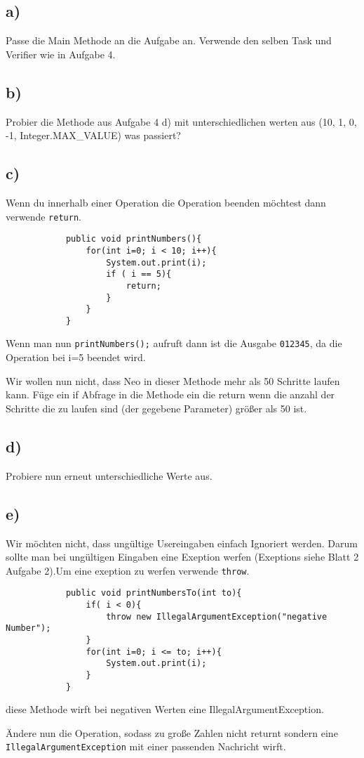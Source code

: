 \subsection*{a)}
	Passe die Main Methode an die Aufgabe an. Verwende den selben Task und Verifier wie in Aufgabe 4.
\subsection*{b)}
	Probier die Methode aus Aufgabe 4 d) mit unterschiedlichen werten aus (10, 1, 0, -1, Integer.MAX_VALUE) was passiert?
\subsection*{c)}
	\begin{Infobox}[Return]
		Wenn du innerhalb einer Operation die Operation beenden möchtest dann verwende \lstinline{return}.
		\begin{lstlisting}
			public void printNumbers(){
				for(int i=0; i < 10; i++){
					System.out.print(i);
					if ( i == 5){
						return;
					}
				}
			}
		\end{lstlisting}
		Wenn man nun \lstinline{printNumbers();} aufruft dann ist die Ausgabe  \lstinline{012345}, da die Operation bei i=5 beendet wird.
	\end{Infobox}
	Wir wollen nun nicht, dass Neo in dieser Methode mehr als 50 Schritte laufen kann. Füge ein if Abfrage in die Methode ein die return wenn die anzahl der Schritte die zu laufen sind (der gegebene Parameter) größer als 50 ist.
\subsection*{d)}
	Probiere nun erneut unterschiedliche Werte aus.
\subsection*{e)}
	\begin{Infobox}
	Wir möchten nicht, dass ungültige Usereingaben einfach Ignoriert werden. Darum sollte man bei ungültigen Eingaben eine Exeption werfen (Exeptions siehe Blatt 2 Aufgabe 2).Um eine exeption zu werfen verwende \lstinline{throw}.
	 	\begin{lstlisting}
			public void printNumbersTo(int to){
				if( i < 0){
					throw new IllegalArgumentException("negative Number");	
				}
				for(int i=0; i <= to; i++){
					System.out.print(i);
				}
			}
		\end{lstlisting}
	diese Methode wirft bei negativen Werten eine IllegalArgumentException.
	\end{Infobox}
	Ändere nun die Operation, sodass zu große Zahlen nicht returnt sondern eine \lstinline{IllegalArgumentException} mit einer passenden Nachricht wirft.
